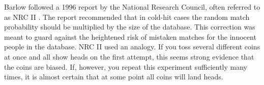\documentclass{article}
\begin{document}
Barlow followed a 1996 report by the National Research Council, often referred to as NRC II %
\citep{NRCII1996}. 
The report recommended that in cold-hit cases the random match probability %
should be multiplied by the size of the database.
%
%
 This correction was meant to guard against the heightened risk of mistaken matches  for  the innocent people in the database. 
%
NRC II used an analogy. 
If you toss several different coins at once and all show heads on the first attempt, this seems strong evidence that the coins are biased. If, however, you repeat this experiment sufficiently many times, it is almost certain that at some point all coins will land heads. 
\end{document}
